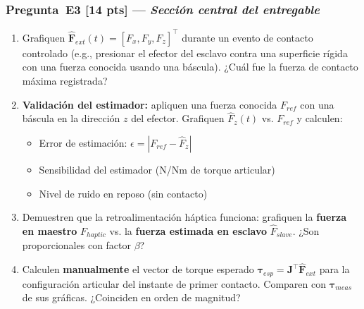 \documentclass[journal,10pt,twoside]{IEEEtran}
\newcommand{\pts}[1]{\textbf{\color{tec_red}[#1 pts]}}
\begin{document}
\subsubsection*{Pregunta~E3 \pts{14} — \textit{Sección central del entregable}}
\begin{enumerate}[label=(\alph*)]
  \item Grafiquen $\hat{\bm{F}}_{ext}(t) = [F_x, F_y, F_z]^\top$
        durante un evento de contacto controlado
        (e.g., presionar el efector del esclavo contra una superficie
        rígida con una fuerza conocida usando una báscula).
        ¿Cuál fue la fuerza de contacto máxima registrada?
  \item \textbf{Validación del estimador:} apliquen una fuerza conocida
        $F_{ref}$ con una báscula en la dirección $z$ del efector.
        Grafiquen $\hat{F}_z(t)$ vs. $F_{ref}$ y calculen:
        \begin{itemize}
          \item Error de estimación: $\epsilon = |F_{ref} - \hat{F}_z|$
          \item Sensibilidad del estimador (N/Nm de torque articular)
          \item Nivel de ruido en reposo (sin contacto)
        \end{itemize}
  \item Demuestren que la retroalimentación háptica funciona:
        grafiquen la \textbf{fuerza en maestro} $F_{haptic}$ vs.
        la \textbf{fuerza estimada en esclavo} $\hat{F}_{slave}$.
        ¿Son proporcionales con factor $\beta$?
  \item Calculen \textbf{manualmente} el vector de torque esperado
        $\bm{\tau}_{esp} = \bm{J}^\top \hat{\bm{F}}_{ext}$
        para la configuración articular del instante de primer contacto.
        Comparen con $\bm{\tau}_{meas}$ de sus gráficas.
        ¿Coinciden en orden de magnitud?
\end{enumerate}
\end{document}
